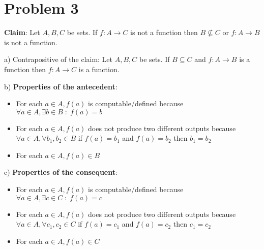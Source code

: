 \documentclass{article}
\begin{document}
\pagebreak
\section{Problem 3}
\textbf{Claim}: Let $A,B,C$ be sets.  If $f : A \rightarrow C$ is not a function then $B\not\subseteq C$ or $f : A \rightarrow B$ is not a function.\vspace{10pt}

a) Contrapositive of the claim: Let $A,B,C$ be sets. If $B \subseteq C$ and $f : A \rightarrow B$ is a function then $f : A \rightarrow C$ is a function.\vspace{10pt}

b) \textbf{Properties of the antecedent}:\vspace{2pt}
\begin{itemize}
    \item For each $a\in A, f(a)$ is computable/defined because $\forall a\in A, \exists b\in B\;\colon\;f(a)=b$
    \item For each $a\in A, f(a)$ does not produce two different outputs because $\forall a\in A,\forall b_1,b_2\in B$ if $f(a)=b_1$ and $f(a)=b_2$ then $b_1=b_2$
    \item For each $a\in A, f(a)\in B$
\end{itemize}\vspace{10pt}

c) \textbf{Properties of the consequent}:\vspace{2pt}
\begin{itemize}
    \item For each $a\in A, f(a)$ is computable/defined because $\forall a\in A, \exists c\in C\;\colon\;f(a)=c$
    \item For each $a\in A, f(a)$ does not produce two different outputs because $\forall a\in A,\forall c_1,c_2\in C$ if $f(a)=c_1$ and $f(a)=c_2$ then $c_1=c_2$
    \item For each $a\in A, f(a)\in C$ 
\end{itemize}\vspace{10pt}

\pagebreak
\end{document}
